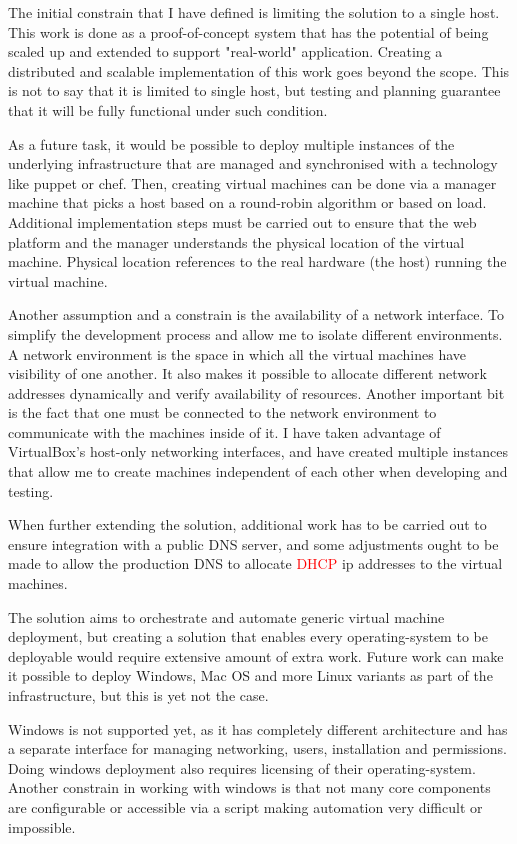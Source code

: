 \documentclass{article}
\begin{document}
The initial constrain that I have defined is limiting the solution to a single host. This work is done as a proof-of-concept system that has the potential of being scaled up and extended to support "real-world" application.
Creating a distributed and scalable implementation of this work goes beyond the scope. This is not to say that it is limited to single host, but testing and planning guarantee that it will be fully functional under such condition.

As a future task, it would be possible to deploy multiple instances of the underlying infrastructure that are managed and synchronised with a technology like puppet or chef. Then, creating virtual machines can be done via a manager machine that picks a host based on a round-robin algorithm or based on load. Additional implementation steps must be carried out to ensure that the web platform and the manager understands the physical location of the virtual machine. Physical location references to the real hardware (the host) running the virtual machine.

Another assumption and a constrain is the availability of a network interface. To simplify the development process and allow me to isolate different environments. A network environment is the space in which all the virtual machines have visibility of one another. It also makes it possible to allocate different network addresses dynamically and verify availability of resources. Another important bit is the fact that one must be connected to the network environment to communicate with the machines inside of it. I have taken advantage of VirtualBox's host-only networking interfaces, and have created multiple instances that allow me to create machines independent of each other when developing and testing.

When further extending the solution, additional work has to be carried out to ensure integration with a public DNS server, and some adjustments ought to be made to allow the production DNS to allocate \textcolor{red}{DHCP} ip addresses to the virtual machines.

The solution aims to orchestrate and automate generic virtual machine deployment, but creating a solution that enables every \gls{operating-system} to be deployable would require extensive amount of extra work. Future work can make it possible to deploy Windows, Mac OS and more Linux variants as part of the infrastructure, but this is yet not the case.

Windows is not supported yet, as it has completely different architecture and has a separate interface for managing networking, users, installation and permissions. Doing windows deployment also requires licensing of their \gls{operating-system}. Another constrain in working with windows is that not many core components are configurable or accessible via a script making automation very difficult or impossible.
\end{document}
